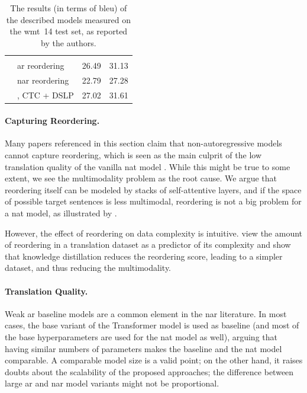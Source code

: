 \begin{table}
\begin{adjustbox}{totalheight=\baselineskip}
\begin{tabular}{clcc}
    & \citet{ran-etal-2021-guiding} \\
    & \quad \acs{ar} reordering & 26.49 & 31.13  \\
    & \quad \acs{nar} reordering  & 22.79 & 27.28 \\

    & \citet{huang-etal-2021-nonautoregressive}, CTC + DSLP & 27.02  &  31.61 \\
    \bottomrule
  \end{tabular}
  \end{adjustbox}
  \caption{The results (in terms of \acs{bleu}) of the described models
    measured on the \acs{wmt}~14 test set, as reported by the authors.}%
  \label{tab:related:wmt14}
\end{table}

\paragraph{Capturing Reordering.} Many papers referenced in this section claim
that non-autoregressive models cannot capture reordering, which is seen as the
main culprit of the low translation quality of the vanilla \acs{nat} model
\citep{gu-kong-2021-fully, ran-etal-2021-guiding}.  While this might be true to
some extent, we see the multimodality problem as the root cause.  We argue that
reordering itself can be modeled by stacks of self-attentive layers, and if the
space of possible target sentences is less multimodal, reordering is not a big
problem for a \acs{nat} model, as illustrated by \citet{du2021orderagnostic}.

However, the effect of reordering on data complexity is intuitive.
\citet{zhou-etal-2020-understanding} view the amount of reordering in a
translation dataset as a predictor of its complexity and show that knowledge
distillation reduces the reordering score, leading to a simpler dataset, and
thus reducing the multimodality.

\paragraph{Translation Quality.} Weak \acl{ar} baseline models are a common
element in the \acl{nar} literature. In most cases, the base variant of the
Transformer model is used as baseline (and most of the base hyperparameters are
used for the \ac{nat} model as well), arguing that having similar numbers of
parameters makes the baseline and the \ac{nat} model comparable. A comparable
model size is a valid point; on the other hand, it raises doubts about the
scalability of the proposed approaches; the difference between large \ac{ar}
and \ac{nar} model variants might not be proportional.

